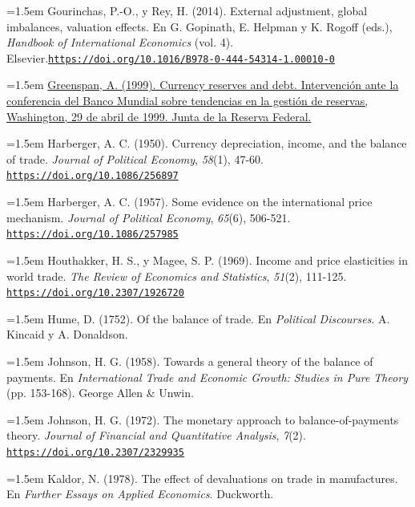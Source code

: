 \documentclass[10pt,a4paper]{article}
\begin{document}
\noindent\hangindent=1.5em Gourinchas, P.-O., y Rey, H. (2014). External adjustment, global imbalances, valuation effects. En G. Gopinath, E. Helpman y K. Rogoff (eds.), \textit{Handbook of International Economics} (vol. 4). Elsevier.\hfil\break\href{https://doi.org/10.1016/B978-0-444-54314-1.00010-0}{\nolinkurl{https://doi.org/10.1016/B978-0-444-54314-1.00010-0}}

\noindent\hangindent=1.5em \href{https://www.federalreserve.gov/boarddocs/speeches/1999/19990429.htm}{Greenspan, A. (1999). Currency reserves and debt. Intervención ante la conferencia del Banco Mundial sobre tendencias en la gestión de reservas, Washington, 29 de abril de 1999. Junta de la Reserva Federal.}

\noindent\hangindent=1.5em Harberger, A. C. (1950). Currency depreciation, income, and the balance of trade. \textit{Journal of Political Economy}, \textit{58}(1), 47-60. \href{https://doi.org/10.1086/256897}{\nolinkurl{https://doi.org/10.1086/256897}}

\noindent\hangindent=1.5em Harberger, A. C. (1957). Some evidence on the international price mechanism. \textit{Journal of Political Economy}, \textit{65}(6), 506-521. \href{https://doi.org/10.1086/257985}{\nolinkurl{https://doi.org/10.1086/257985}}

\noindent\hangindent=1.5em Houthakker, H. S., y Magee, S. P. (1969). Income and price elasticities in world trade. \textit{The Review of Economics and Statistics}, \textit{51}(2), 111-125. \href{https://doi.org/10.2307/1926720}{\nolinkurl{https://doi.org/10.2307/1926720}}

\noindent\hangindent=1.5em Hume, D. (1752). Of the balance of trade. En \textit{Political Discourses}. A. Kincaid y A. Donaldson.

\noindent\hangindent=1.5em Johnson, H. G. (1958). Towards a general theory of the balance of payments. En \textit{International Trade and Economic Growth: Studies in Pure Theory} (pp. 153-168). George Allen \& Unwin.

\noindent\hangindent=1.5em Johnson, H. G. (1972). The monetary approach to balance-of-payments theory. \textit{Journal of Financial and Quantitative Analysis}, \textit{7}(2). \href{https://doi.org/10.2307/2329935}{\nolinkurl{https://doi.org/10.2307/2329935}}

\noindent\hangindent=1.5em Kaldor, N. (1978). The effect of devaluations on trade in manufactures. En \textit{Further Essays on Applied Economics}. Duckworth.
\end{document}
